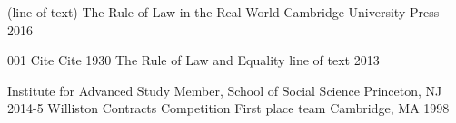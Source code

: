 \documentclass[]{awesome-cv}
\begin{document}
\vspace{-7mm}
\begin{cventries}
	\cventry
	{(line of text)}
	{The Rule of Law in the Real World}
	{Cambridge University Press}
	{2016}
	{}
	
	\vspace{-5mm}
	\cventry
	{001 Cite Cite 1930}
	{The Rule of Law and Equality}
	{line of text}
	{2013}
	{}
	
	\vspace{-5mm}
\end{cventries}
\begin{cvhonors}
	\cvhonor
	{Institute for Advanced Study}
	{Member, School of Social Science}
	{Princeton, NJ}
	{2014-5}
	\cvhonor
	{Williston Contracts Competition}
	{First place team}
	{Cambridge, MA}
	{1998}
\end{cvhonors}
\ 
\end{document}
